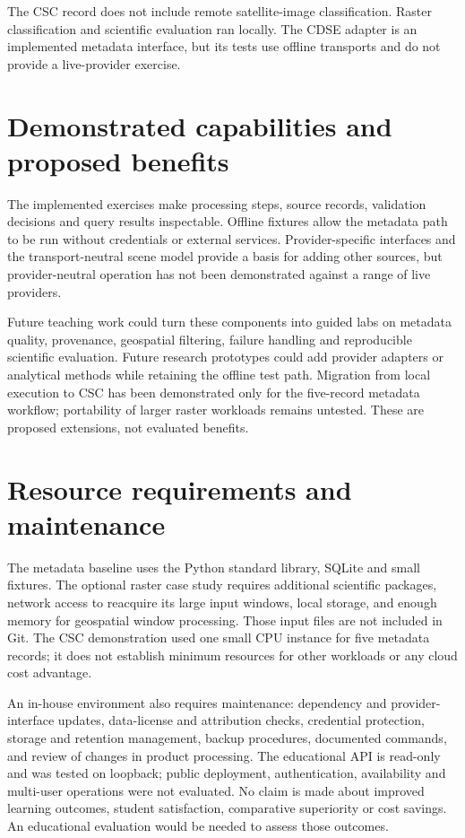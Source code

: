 The CSC record does not include remote satellite-image classification. Raster classification
and scientific evaluation ran locally. The CDSE adapter is an implemented metadata interface,
but its tests use offline transports and do not provide a live-provider exercise.

\section{Demonstrated capabilities and proposed benefits}

The implemented exercises make processing steps, source records, validation decisions and
query results inspectable. Offline fixtures allow the metadata path to be run without
credentials or external services. Provider-specific interfaces and the transport-neutral
scene model provide a basis for adding other sources, but provider-neutral operation has not
been demonstrated against a range of live providers.

Future teaching work could turn these components into guided labs on metadata quality,
provenance, geospatial filtering, failure handling and reproducible scientific evaluation.
Future research prototypes could add provider adapters or analytical methods while retaining
the offline test path. Migration from local execution to CSC has been demonstrated only for
the five-record metadata workflow; portability of larger raster workloads remains untested.
These are proposed extensions, not evaluated benefits.

\section{Resource requirements and maintenance}

The metadata baseline uses the Python standard library, SQLite and small fixtures. The
optional raster case study requires additional scientific packages, network access to
reacquire its large input windows, local storage, and enough memory for geospatial window
processing. Those input files are not included in Git. The CSC demonstration used one
small CPU instance for five metadata records; it does not establish minimum resources for
other workloads or any cloud cost advantage.

An in-house environment also requires maintenance: dependency and provider-interface updates,
data-license and attribution checks, credential protection, storage and retention management,
backup procedures, documented commands, and review of changes in product processing. The
educational API is read-only and was tested on loopback; public deployment, authentication,
availability and multi-user operations were not evaluated. No claim is made about improved
learning outcomes, student satisfaction, comparative superiority or cost savings. An
educational evaluation would be needed to assess those outcomes.
